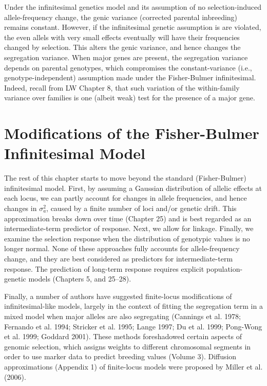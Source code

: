 \documentclass{article}
\begin{document}
Under the infinitesimal genetics model and its assumption of no selection-induced allele-frequency change, the genic variance (corrected parental inbreeding) remains constant. However, if the infinitesimal genetic assumption is are violated, the even allels with very small effects eventually will have their frequencies changed by selection. This alters the genic variance, and hence changes the segregation variance. When major genes are present, the segregation variance depends on parental genotypes, which compromises the constant-variance (i.e., genotype-independent) assumption made under the Fisher-Bulmer infinitesimal. Indeed, recall from LW Chapter 8, that such variation of the within-family variance over families is one (albeit weak) test for the presence of a major gene.

\section{Modifications of the Fisher-Bulmer Infinitesimal Model}
The rest of this chapter starts to move beyond the standard (Fisher-Bulmer) infinitesimal model. First, by assuming a Gaussian distribution of allelic effects at each locus, we can partly account for changes in allele frequencies, and hence changes in  $ \sigma_a^2 $, caused by a finite number of loci and/or genetic drift. This approximation breaks down over time (Chapter 25) and is best regarded as an intermediate-term predictor of response. Next, we allow for linkage. Finally, we examine the selection response when the distribution of genotypic values is no longer normal. None of these approaches fully accounts for allele-frequency change, and they are best considered as predictors for intermediate-term response. The prediction of long-term response requires explicit population-genetic models (Chapters 5, and 25–28).

Finally, a number of authors have suggested finite-locus modifications of infinitesimal-like models, largely in the context of fitting the segregation term in a mixed model when major alleles are also segregating (Cannings et al. 1978; Fernando et al. 1994; Stricker et al. 1995; Lange 1997; Du et al. 1999; Pong-Wong et al. 1999; Goddard 2001). These methods foreshadowed certain aspects of genomic selection, which assigns weights to different chromosomal segments in order to use marker data to predict breeding values (Volume 3). Diffusion approximations (Appendix 1) of finite-locus models were proposed by Miller et al. (2006).
\end{document}
